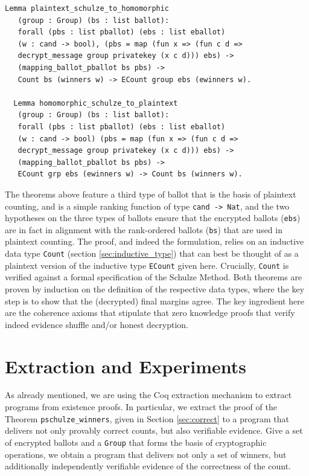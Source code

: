 \begin{lstlisting}[frame=single,basicstyle=\ttfamily\footnotesize]
  Lemma plaintext_schulze_to_homomorphic 
   (group : Group) (bs : list ballot): 
   forall (pbs : list pballot) (ebs : list eballot) 
   (w : cand -> bool), (pbs = map (fun x => (fun c d => 
   decrypt_message group privatekey (x c d))) ebs) ->
   (mapping_ballot_pballot bs pbs) -> 
   Count bs (winners w) -> ECount group ebs (ewinners w).
      
  Lemma homomorphic_schulze_to_plaintext 
   (group : Group) (bs : list ballot):
   forall (pbs : list pballot) (ebs : list eballot) 
   (w : cand -> bool) (pbs = map (fun x => (fun c d => 
   decrypt_message group privatekey (x c d))) ebs) ->
   (mapping_ballot_pballot bs pbs) ->
   ECount grp ebs (ewinners w) -> Count bs (winners w).
\end{lstlisting}

\noindent
The theorems above feature a third type of ballot that is the basis
of plaintext counting, and is a simple ranking function of type
\texttt{cand -> Nat}, and the two hypotheses on the three types of
ballots ensure that the encrypted ballots (\texttt{ebs}) are in fact
in alignment with the rank-ordered ballots (\texttt{bs}) that are
used in plaintext counting. The proof, and indeed the formulation, 
relies on an inductive data
type \texttt{Count}  (section \ref{sec:inductive_type}) that can best be 
thought of as a plaintext
version of the inductive type  \texttt{ECount} given here.
Crucially, \texttt{Count} is verified against a formal specification
of the Schulze Method. Both theorems are proven by induction on the
definition of the respective data types, where the key step is to
show that the (decrypted) final margins agree. The key ingredient
here are the coherence axioms that stipulate that zero knowledge
proofs that verify indeed evidence shuffle and/or honest decryption.


\section{Extraction and Experiments} \label{sec:extract}

As already mentioned, we are using  the Coq extraction
mechanism\citep{Letouzey:2003:NEC}  to extract programs from
existence proofs. 
In particular, we extract the proof of the Theorem
\texttt{pschulze\_winners}, given in Section \ref{sec:correct} to a
program that delivers not only provably correct counts, but also
verifiable evidence.  Give a set of encrypted ballots and a \texttt{Group}
that forms the basis of cryptographic operations, we obtain a program that
delivers not only a set of winners, but additionally independently  verifiable
evidence of the correctness of the count. 

